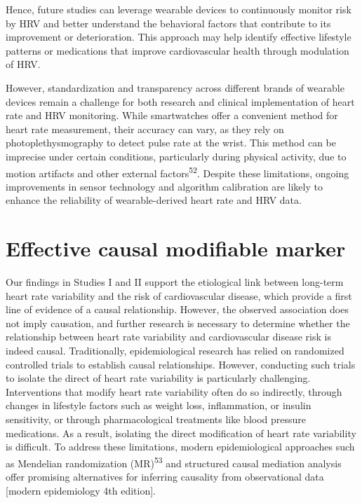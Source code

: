\documentclass[
  a4paper,
  headsepline=true,
  open=any]{scrbook}
\begin{document}
Hence, future studies can leverage wearable devices to continuously
monitor risk by HRV and better understand the behavioral factors that
contribute to its improvement or deterioration. This approach may help
identify effective lifestyle patterns or medications that improve
cardiovascular health through modulation of HRV.

However, standardization and transparency across different brands of
wearable devices remain a challenge for both research and clinical
implementation of heart rate and HRV monitoring. While smartwatches
offer a convenient method for heart rate measurement, their accuracy can
vary, as they rely on photoplethysmography to detect pulse rate at the
wrist. This method can be imprecise under certain conditions,
particularly during physical activity, due to motion artifacts and other
external factors\textsuperscript{52}. Despite these limitations, ongoing
improvements in sensor technology and algorithm calibration are likely
to enhance the reliability of wearable-derived heart rate and HRV data.

\hypertarget{effective-causal-modifiable-marker}{%
\section{Effective causal modifiable
marker}\label{effective-causal-modifiable-marker}}

Our findings in Studies I and II support the etiological link between
long-term heart rate variability and the risk of cardiovascular disease,
which provide a first line of evidence of a causal relationship.
However, the observed association does not imply causation, and further
research is necessary to determine whether the relationship between
heart rate variability and cardiovascular disease risk is indeed causal.
Traditionally, epidemiological research has relied on randomized
controlled trials to establish causal relationships. However, conducting
such trials to isolate the direct of heart rate variability is
particularly challenging. Interventions that modify heart rate
variability often do so indirectly, through changes in lifestyle factors
such as weight loss, inflammation, or insulin sensitivity, or through
pharmacological treatments like blood pressure medications. As a result,
isolating the direct modification of heart rate variability is
difficult. To address these limitations, modern epidemiological
approaches such as Mendelian randomization (MR)\textsuperscript{53} and
structured causal mediation analysis offer promising alternatives for
inferring causality from observational data {[}modern epidemiology 4th
edition{]}.
\end{document}
